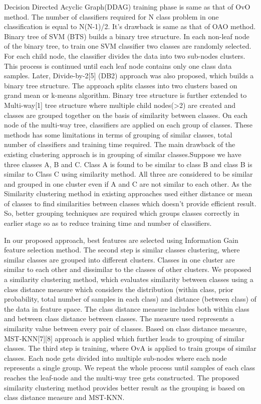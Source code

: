 \documentclass[a4paper, 10pt, conference]{ieeeconf}      %
\begin{document}
\par
Decision Directed Acyclic Graph(DDAG) training phase is same as that of OvO method. The number of classifiers required for N class problem in one classification is equal to N(N-1)/2. It's drawback is same as that of OAO method. Binary tree of SVM (BTS) builds a binary tree structure. In each non-leaf node of the binary tree, to train one SVM classifier two classes are randomly selected. For each child node, the classifier divides the data into two sub-nodes clusters. This process is continued until each leaf node contains only one class data samples.
Later, Divide-by-2[5] (DB2) approach was also proposed, which builds a binary tree structure. The approach splits classes into two clusters based on grand mean or k-means algorithm. Binary tree structure is further extended to Multi-way[1] tree structure where multiple child nodes(\textgreater2) are created and classes are grouped together on the basis of similarity between classes. On each node of the multi-way tree, classifiers are applied on each group of classes.
These methods has some limitations in terms of grouping of similar classes, total number of classifiers and training time required. The main drawback of the existing clustering approach is in grouping of similar classes.Suppose we have three classes A, B and C. Class A is found to be similar to class B and class B is similar to Class C using similarity method. All three are considered to be similar and grouped in one cluster even if A and C are not similar to each other. As the Similarity clustering method in existing approaches used either distance or mean of classes to find similarities between classes which doesn't provide efficient result. So, better grouping techniques are required which groups classes correctly in earlier stage so as to reduce training time and number of classifiers.
\par
In our proposed approach, best features are selected using Information Gain feature selection method. The second step is similar classes clustering, where similar classes are grouped into different clusters. Classes in one cluster are similar to each other and dissimilar to the classes of other clusters. We proposed a similarity clustering method, which evaluates similarity between classes using a class distance measure which considers the distribution (within class, prior probability, total number of samples in each class) and distance (between class) of the data in feature space. The class distance measure includes both within class and between class distance between classes. The measure used represents a similarity value between every pair of classes. Based on class distance measure, MST-KNN[7][8] approach is applied which further leads to grouping of similar classes. The third step is training, where OvA is applied to train groups of similar classes. Each node gets divided into multiple sub-nodes where each node represents a single group. We repeat the whole process until samples of each class reaches the leaf-node and the multi-way tree gets constructed. The proposed similarity clustering method provides better result as the grouping is based on class distance measure and MST-KNN.
\end{document}
